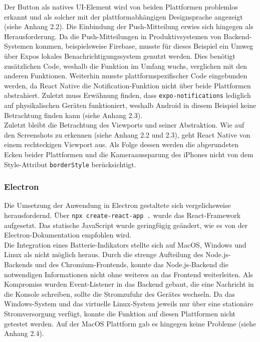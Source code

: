 \documentclass[a4paper]{scrartcl}
\begin{document}
Der Button als natives UI-Element wird von beiden Plattformen problemlos erkannt und als solcher mit der plattformabhängigen Designsprache angezeigt (siehe Anhang 2.2). Die Einbindung der Push-Mitteilung erwies sich hingegen als Herausforderung. Da die Push-Mitteilungen in Produktivsystemen von Backend-Systemen kommen, beispielsweise Firebase, musste für dieses Beispiel ein Umweg über Expos lokales Benachrichtigungssystem genutzt werden. Dies benötigt zusätzlichen Code, weshalb die Funktion im Umfang wuchs, verglichen mit den anderen Funktionen. Weiterhin musste plattformspezifischer Code eingebunden werden, da React Native die Notification-Funktion nicht über beide Plattformen abstrahiert. Zuletzt muss Erwähnung finden, dass \texttt{expo-notifications} lediglich auf physikalischen Geräten funktioniert, weshalb Android in diesem Beispiel keine Betrachtung finden kann (siehe Anhang 2.3). \\

Zuletzt bleibt die Betrachtung des Viewports und seiner Abstraktion. Wie auf den Screenshots zu erkennen (siehe Anhang 2.2 und 2.3), geht React Native von einem rechteckigen Viewport aus. Als Folge dessen werden die abgerundeten Ecken beider Plattformen und die Kameraaussparung des iPhones nicht von dem Style-Attribut \texttt{borderStyle} berücksichtigt.

\subsubsection{Electron}

Die Umsetzung der Anwendung in Electron gestaltete sich vergelichsweise herausfordernd. Über \texttt{npx create-react-app .} wurde das React-Framework aufgesetzt. Das statische JavaScript wurde geringfügig geändert, wie es von der Electron-Dokumentation empfohlen wird. \\

Die Integration eines Batterie-Indikators stellte sich auf MacOS, Windows und Linux als nicht möglich heraus. Durch die strenge Aufteilung des Node.js-Backends und des Chromium-Frontends, konnte das Node.js-Backend die notwendigen Informationen nicht ohne weiteres an das Frontend weiterleiten. Als Kompromiss wurden Event-Listener in das Backend gebaut, die eine Nachricht in die Konsole schreiben, sollte die Stromzufuhr des Gerätes wechseln. Da das Windows-System und das virtuelle Linux-System jeweils nur über eine stationäre Stromversorgung verfügt, konnte die Funktion auf diesen Plattformen nicht getestet werden. Auf der MacOS Plattform gab es hingegen keine Probleme (siehe Anhang 2.4). \\
\end{document}
